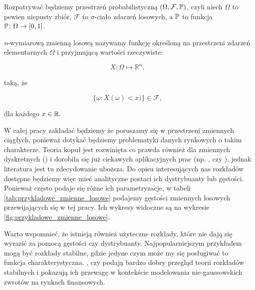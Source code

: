 Rozpatrywać będziemy przestrzeń probabilistyczną $(\Omega,\mathcal{F},\mathbb{P})$, czyli niech $\Omega$ to pewien niepusty zbiór, $\mathcal{F}$ to $\sigma$-ciało zdarzeń losowych, a $\mathbb{P}$ to funkcja $\mathbb{P}\colon\Omega\rightarrow[0,1]$. 

\begin{df}
	\label{df:n_wym_zmienna_losowa}
	\textit{n}-wymiarową zmienną losową nazywamy funkcję określoną na przestrzeni zdarzeń elementarnych $\Omega$ i przyjmującą wartości rzeczywiste:
	
	$$ X\colon \Omega \mapsto \mathbb{R}^{n}, $$

	taką, że
	
	$$ \{ \omega \colon X(\omega) < x) \} \in \mathcal{F},$$
	
	dla każdego $x \in \mathbb{R}.$
\end{df}

W całej pracy zakładać będziemy że poruszamy się w przestrzeni zmiennych ciągłych, ponieważ dotykać będziemy problematyki danych rynkowych o takim charakterze. Teoria kopuł jest rozwinięta co prawda również dla zmiennych dyskretnych (\cite{Genest_Discrete_Copulas}) i dorobiła się już ciekawych aplikacyjnych prac (np. \cite{Koopman_DiscreteCopula_HTF}, czy \cite{Shefzik_Weather}), jednak literatura jest tu zdecydowanie uboższa. Do opisu interesujących nas rozkładów dostępne będziemy więc mieć analityczne postaci ich dystrybuanty lub gęstości. Ponieważ często podaje się różne ich parametryzacje, w tabeli \ref{tab:przykladowe_zmienne_losowe} podajemy gęstości zmiennych losowych przewijających się w tej pracy. Ich wykresy widoczne są na wykresie \ref{fig:przykladowe_zmienne_losowe}.

Warto wspomnieć, że istnieją również użyteczne rozkłady, które nie dają się wyrazić za pomocą gęstości czy dystrybuanty. Najpopularniejszym przykładem mogą być rozkłady stabilne, gdzie jedyne czym może my się posługiwać to funkcja charakterystyczna.  \cite{Stable_Distributions1}, czy \cite{Stable_Distributions2} podają bardzo dobry przegląd teorii rozkładów stabilnych i pokazują ich przewagę w kontekście modelowania nie-gaussowskich zwrotów na rynkach finansowych.

